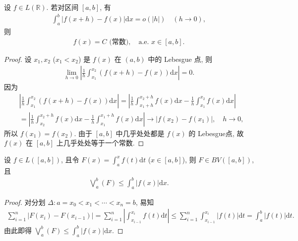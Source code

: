 \documentclass[../../main.tex]{subfiles}%
\begin{document}
\begin{proposition}
设 $f\in L(\mathbb{R})$. 若对区间 $[a,b]$, 有
\begin{align*}
\int_a^b |f(x+h)-f(x)|\mathrm{d}x = o(|h|) \quad (h\to 0),
\end{align*}
则
\begin{align*}
f(x) = C \text{ (常数)}, \quad \text{a.e. } x\in[a,b].
\end{align*}
\end{proposition}
\begin{proof}

设 $x_1,x_2$ ($x_1<x_2$) 是 $f(x)$ 在 $(a,b)$ 中的 Lebesgue 点, 则
\begin{align*}
\lim_{h\to 0} \left|\frac{1}{h}\int_{x_1}^{x_2} (f(x+h)-f(x))\mathrm{d}x\right| = 0.
\end{align*}
因为
\begin{align*}
&\left|\frac{1}{h}\int_{x_1}^{x_2} (f(x+h)-f(x))\mathrm{d}x\right|
= \left|\frac{1}{h}\int_{x_1+h}^{x_2+h} f(x)\mathrm{d}x - \frac{1}{h}\int_{x_1}^{x_2} f(x)\mathrm{d}x\right| \\
&= \left|\frac{1}{h}\int_{x_2}^{x_2+h} f(x)\mathrm{d}x - \frac{1}{h}\int_{x_1}^{x_1+h} f(x)\mathrm{d}x\right| 
\to |f(x_2)-f(x_1)|, \quad h\to 0,
\end{align*}
所以 $f(x_1)=f(x_2)$. 由于 $[a,b]$ 中几乎处处都是 $f(x)$ 的 Lebesgue点, 故 $f(x)$ 在 $[a,b]$ 上几乎处处等于一个常数.

\end{proof}

\begin{proposition}
设 $f\in L([a,b])$, 且令 $F(x)=\int_a^x f(t)\mathrm{d}t$ ($x\in[a,b]$), 则 $F\in  BV([a,b])$, 且
\begin{align*}
\bigvee_a^b(F) \leqslant \int_a^b |f(x)|\mathrm{d}x.
\end{align*}
\end{proposition}
\begin{proof}

对分划 $\Delta: a=x_0<x_1<\cdots<x_n=b$, 易知
\begin{align*}
\sum_{i=1}^n |F(x_i)-F(x_{i-1})| = \sum_{i=1}^n \left|\int_{x_{i-1}}^{x_i} f(t)\mathrm{d}t\right| 
\leqslant \sum_{i=1}^n \int_{x_{i-1}}^{x_i} |f(t)|\mathrm{d}t = \int_a^b |f(t)|\mathrm{d}t.
\end{align*}
由此即得 $\bigvee_a^b(F)\leqslant\int_a^b |f(x)|\mathrm{d}x$.

\end{proof}
\end{document}
